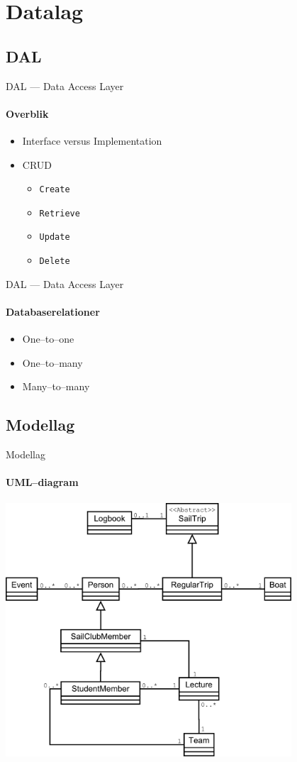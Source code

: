\section{Datalag}

\subsection{DAL}

\begin{frame}{DAL --- Data Access Layer}
  \framesubtitle{Overblik}
  \begin{itemize}
    \item Interface versus Implementation
    \item CRUD
    \begin{itemize}
      \item \texttt{{\Large C}reate}
      \item \texttt{{\Large R}etrieve}
      \item \texttt{{\Large U}pdate}
      \item \texttt{{\Large D}elete}
    \end{itemize}
  \end{itemize}
\end{frame}

\begin{frame}{DAL --- Data Access Layer}
  \framesubtitle{Databaserelationer}
  \begin{itemize}
    \item One--to--one
    \item One--to--many
    \item Many--to--many
  \end{itemize}
\end{frame}


\subsection{Modellag}

\begin{frame}{Modellag}
  \framesubtitle{UML--diagram}
  \begin{center}
    \includegraphics[width=0.8\textwidth,height=0.8\textheight,keepaspectratio]{images/UML.pdf}
  \end{center}
\end{frame}

